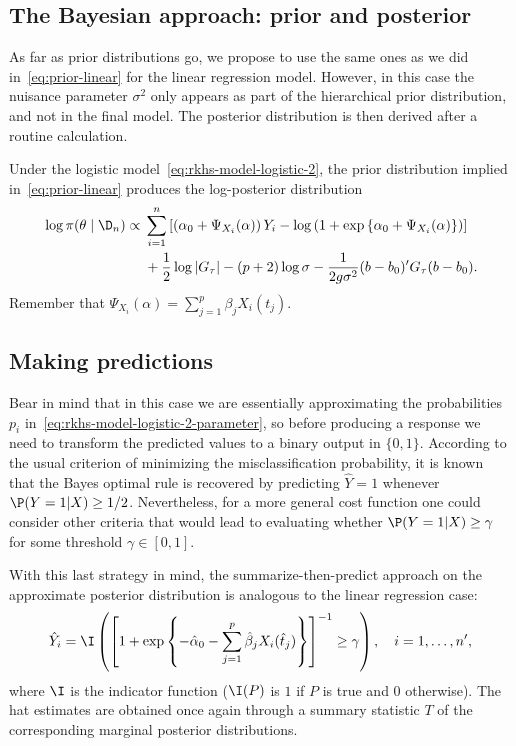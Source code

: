 \subsection*{The Bayesian approach: prior and posterior}

As far as prior distributions go, we propose to use the same ones as we did in~\eqref{eq:prior-linear} for the linear regression model. However, in this case the nuisance parameter \(\sigma^2\) only appears as part of the hierarchical prior distribution, and not in the final model. The posterior distribution is then derived after a routine calculation.

\begin{proposition}
Under the logistic model~\eqref{eq:rkhs-model-logistic-2}, the prior distribution implied in~\eqref{eq:prior-linear} produces the log-posterior distribution
\begin{align*}
  \log \pi(\theta \mid \D_n) \propto {} & \sum_{i=1}^n \left[ \left(\alpha_0 + \Psi_{X_i}(\alpha)\right)Y_i - \log\left(1 + \exp\left\{\alpha_0 + \Psi_{X_i}(\alpha)\right\}\right)\right]\\
  \quad &+ \frac{1}{2}\log |G_\tau| - (p+2)\log \sigma -\frac{1}{2g\sigma^2} (b - b_0)'G_\tau(b - b_0).
\end{align*}
Remember that \(\Psi_{X_i}(\alpha) = \sum_{j=1}^p \beta_j X_i(t_j)\).
\end{proposition}

\subsection*{Making predictions}

Bear in mind that in this case we are essentially approximating the probabilities \(p_i\) in~\eqref{eq:rkhs-model-logistic-2-parameter}, so before producing a response we need to transform the predicted values to a binary output in \(\{0, 1\}\). According to the usual criterion of minimizing the misclassification probability, it is known that the Bayes optimal rule is recovered by predicting \(\hat Y=1\) whenever \(\P(Y=1|X) \geq 1/2\). Nevertheless, for a more general cost function one could consider other criteria that would lead to evaluating whether \(\P(Y=1|X) \geq \gamma\) for some threshold \(\gamma\in[0, 1]\).

With this last strategy in mind, the summarize-then-predict approach on the approximate posterior distribution is analogous to the linear regression case:
\[
\hat Y_i = \I \left( \left[\displaystyle 1 + \exp\left\{-\hat\alpha_0 - \sum_{j=1}^p \hat\beta_j X_i(\hat t_j)\right\}\right]^{-1} \geq \gamma \right), \quad i=1,\dots,n',
\]
where \(\I\) is the indicator function (\(\I(P)\) is \(1\) if \(P\) is true and \(0\) otherwise). The hat estimates are obtained once again through a summary statistic \(T\) of the corresponding marginal posterior distributions.

